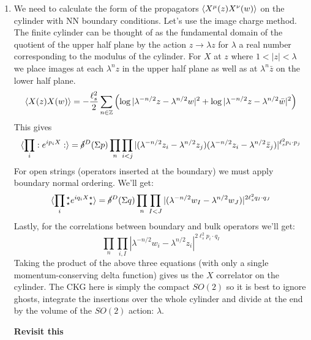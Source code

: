 \documentclass[11pt, class=article, crop=false]{standalone}
\begin{document}
\begin{enumerate}
	\item
	We need to calculate the form of the propagators $\braket{X^\mu(z) X^\nu(w)}$ on the cylinder with NN boundary conditions. Let's use the image charge method. The finite cylinder can be thought of as the fundamental domain of the quotient of the upper half plane by the action $z \to \lambda z$ for $\lambda$ a real number corresponding to the modulus of the cylinder. For $X$ at $z$ where $1<|z|<\lambda$ we place images at each $\lambda^n z$ in the upper half plane as well as at $\lambda^n \bar z$ on the lower half plane. 
	\[
		\braket{X(z) X(w)} = - \frac{\ell_s^2}{2} \sum_{n \in \mathbb{Z}} \left( \log|\lambda^{-n/2} z - \lambda^{n/2} w|^2 +  \log|\lambda^{-n/2} z - \lambda^{n/2} \bar w|^2 \right)
	\]
	This gives
	\[
		\braket{\prod_{i} :e^{i p_i X}:} = \cancel\delta^D(\Sigma p) \prod_{n} \prod_{i < j} |(\lambda^{-n/2} z_i - \lambda^{n/2} z_j) (\lambda^{-n/2} z_i - \lambda^{n/2} \bar z_j)|^{\ell_s^2 p_i \cdot p_j}
	\]
	For open strings (operators inserted at the boundary) we must apply boundary normal ordering. We'll get:
	\[
		\braket{\prod_{i} {_\star^\star} e^{i q_i X} {^\star_\star} } = \cancel\delta^D(\Sigma q) \prod_{n} \prod_{I < J} |(\lambda^{-n/2} w_I - \lambda^{n/2} w_J)|^{2 \ell_s^2 q_I \cdot q_J}
	\]	
	Lastly, for the correlations between boundary and bulk operators we'll get:
	\[
		\prod_n \prod_{i, I} |\lambda^{-n/2} w_i - \lambda^{n/2} z_i|^{2 \ell_s^2 p_i \cdot q_I}
	\]
	Taking the product of the above three equations (with only a single momentum-conserving delta function) gives us the $X$ correlator on the cylinder. The CKG here is simply the compact $SO(2)$ so it is best to ignore ghosts, integrate the insertions over the whole cylinder and divide at the end by the volume of the $SO(2)$ action: $\lambda$. 
	
	\textbf{Revisit this}
	

\end{enumerate}
\end{document}
